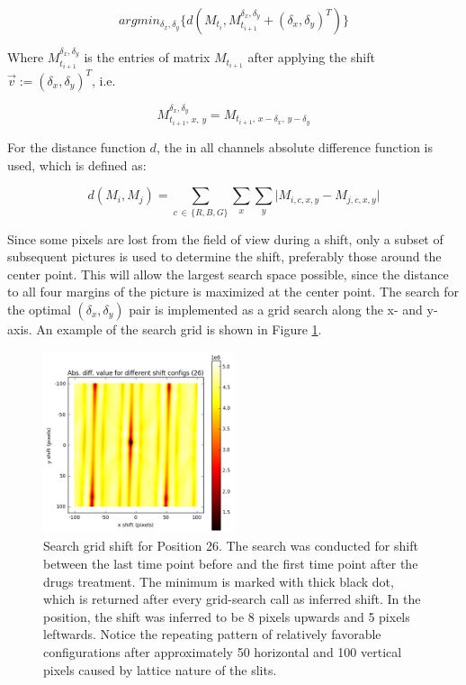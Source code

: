 \documentclass[pdftex,12pt,a4paper]{report}
\begin{document}
$$
argmin_{\delta_x, \delta_y} \{d(M_{t_i}, M_{t_{i+1}}^{\delta_x, \delta_y} + (\delta_x, \delta_y)^T)\}
$$

Where $M_{t_{i+1}}^{\delta_x, \delta_y}$ is the entries of matrix $M_{t_{i+1}}$ after applying the shift $\vec{v} := (\delta_x, \delta_y)^T$, i.e.

$$M_{t_{i+1}, \, x, \, y}^{\delta_x, \delta_y} = M_{t_{i+1}, \, x - \delta_x, \, y - \delta_y}$$

For the distance function $d$, the in all channels absolute difference function is used, which is defined as:

$$
d(M_i, M_j) = \sum_{c \, \in \, \{R, B, G\}} \sum_{x} \sum_{y} \vert M_{i, c, x, y} - M_{j, c, x, y} \vert
$$


Since some pixels are lost from the field of view during a shift, only a subset of subsequent pictures is used to determine the shift, preferably those around the center point. This will allow the largest search space possible, since the distance to all four margins of the picture is maximized at the center point. The search for the optimal $(\delta_x, \delta_y)$ pair is implemented as a grid search along the x- and y-axis. An example of the search grid is shown in Figure \ref{fig:searchgrid}.\\

\begin{figure}[h]
\centering
\includegraphics[width=0.5\textwidth]{images/search_grid}
\caption{Search grid shift for Position 26. The search was conducted for shift between the last time point before and the first time point after the drugs treatment. The minimum is marked with thick black dot, which is returned after every grid-search call as inferred shift. In the position, the shift was inferred to be 8 pixels upwards and 5 pixels leftwards. Notice the repeating pattern of relatively favorable configurations after approximately 50 horizontal and 100 vertical pixels caused by lattice nature of the slits.}
\label{fig:searchgrid}
\end{figure}
\end{document}
